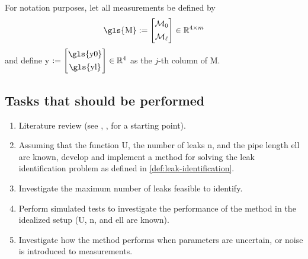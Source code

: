 For notation purposes, let all measurements be defined by
\[
\text{\gls{M}}
:=
\begin{bmatrix}
\mathcal{M}_0 \\[0.4em] 
\mathcal{M}_{\ell}
\end{bmatrix} \in\mathbb{R}^{4\times m} 
\]
and define \gls{y} $:=\begin{bmatrix}
    \text{\gls{y0}} \\[0.4em]
    \text{\gls{yl}}
\end{bmatrix} \in \mathbb{R}^4$ as the $j$-th column of \gls{M}.\\

\begin{samepage}
\subsection*{Tasks that should be performed}
\begin{enumerate}
    \item Literature review (see \cite{peralta2023}, \cite{molno2024parallel}, \cite{molno2024conditions} for a starting point). \\

    \item Assuming that the function \gls{U}, the number of leaks \gls{n}, and the pipe length \gls{ell} are known, develop and implement a method for solving the leak identification problem as defined in \autoref{def:leak-identification}.\\

    \item Investigate the maximum number of leaks feasible to identify.\\
    
    \item Perform simulated tests to investigate the performance of the method in the idealized setup (\gls{U}, \gls{n}, and \gls{ell} are known).\\

    \item Investigate how the method performs when parameters are uncertain, or noise is introduced to measurements.\\
\end{enumerate}
\end{samepage}